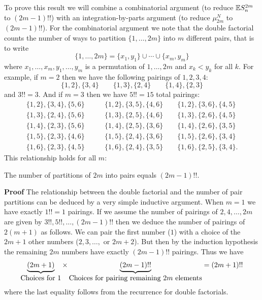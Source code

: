 To prove this result we will combine a combinatorial argument (to reduce ${\mathbb E} S_n^{2m}$ to $(2m-1)!!$) with an integration-by-parts argument (to reduce $\ensuremath{\mu}_{2m}^N$ to $(2m-1)!!$). For the combinatorial argument we note that the double factorial  counts the number of ways to partition $\{1,\ensuremath{\ldots},2m\}$ into $m$ different pairs, that is to write
\[
\{1,\ensuremath{\ldots},2m\} = \{x_1,y_1\} \ensuremath{\cup} \ensuremath{\cdots} \ensuremath{\cup} \{x_m,y_m\}
\]
where $x_1,\ensuremath{\ldots},x_m,y_1,\ensuremath{\ldots},y_m$ is a permutation of $1,\ensuremath{\ldots},2m$ and $x_k < y_k$ for all $k$. For example, if $m = 2$ then we have the following pairings of $1,2,3,4$:
\[
\{1,2\}, \{3,4\} \qquad \{1,3\}, \{2,4\} \qquad \{1,4\}, \{2,3\}
\]
and  $3!! = 3$. And if $m = 3$ then we have $5!! = 15$ total pairings:
\begin{align*}
\{1,2\}, \{3,4\}, \{5,6\} &\qquad \{1,2\}, \{3,5\}, \{4,6\} \qquad \{1,2\}, \{3,6\}, \{4,5\} \\
\{1,3\}, \{2,4\}, \{5,6\} &\qquad \{1,3\}, \{2,5\}, \{4,6\} \qquad \{1,3\}, \{2,6\}, \{4,5\} \\
\{1,4\}, \{2,3\}, \{5,6\} &\qquad \{1,4\}, \{2,5\}, \{3,6\} \qquad \{1,4\}, \{2,6\}, \{3,5\} \\
\{1,5\}, \{2,3\}, \{4,6\} &\qquad \{1,5\}, \{2,4\}, \{3,6\} \qquad \{1,5\}, \{2,6\}, \{3,4\} \\
\{1,6\}, \{2,3\}, \{4,5\} &\qquad \{1,6\}, \{2,4\}, \{3,5\} \qquad \{1,6\}, \{2,5\}, \{3,4\}.
\end{align*}
This relationship holds for all $m$:

\begin{lemma} The number of partitions of $2m$ into pairs equals $(2m-1)!!$.

\end{lemma}
\textbf{Proof} The relationship between the double factorial and the number of pair partitions can be deduced by a very simple inductive argument. When $m = 1$ we have exactly $1!! = 1$ pairings. If we assume the number of pairings of $2, 4, \ensuremath{\ldots}, 2m$ are given by $3!!,5!!,\ensuremath{\ldots},(2m-1)!!$ then we deduce the number of pairings of $2(m+1)$ as follows. We can pair the first number ($1$) with a choice of the $2m+1$ other numbers ($2,3,\ensuremath{\ldots},$ or $2m+2$). But then by the induction hypothesis the remaining $2m$ numbers have exactly $(2m-1)!!$ pairings. Thus we have
\[
\underbrace{(2m+1)}_{\hbox{Choices for $1$}} \times \underbrace{(2m-1)!!}_{\hbox{Choices for pairing remaining $2m$ elements}} = (2m+1)!!
\]
where the last equality follows from the recurrence for double factorials.

